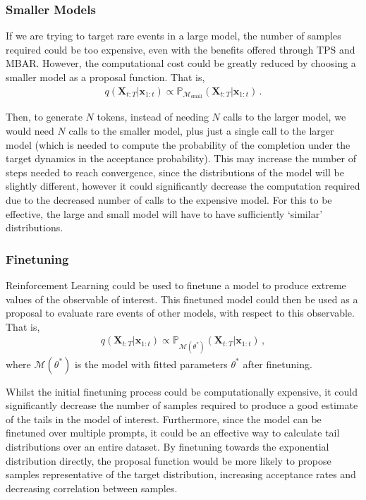 \documentclass{article}
\newcommand{\realtraj}{\mathbf{x}}
\newcommand{\unrealtraj}{\mathbf{X}}
\begin{document}
\subsubsection{Smaller Models}
If we are trying to target rare events in a large model, the number of samples required could be too expensive, even with the benefits offered through TPS and MBAR.
However, the computational cost could be greatly reduced by choosing a smaller model as a proposal function. That is,
\begin{align}
    q(\unrealtraj_{t:T} | \realtraj_{1:t}) \propto \mathbb{P}_{\mathcal{M}_{\text{small}}}( \unrealtraj_{t:T} | \realtraj_{1:t}) \,.
\end{align}


Then, to generate $N$ tokens, instead of needing $N$ calls to the larger model, we would need $N$ calls to the smaller model, plus just a single call to the larger model (which is needed to compute the probability of the completion under the target dynamics in the acceptance probability).
This may increase the number of steps needed to reach convergence, since the distributions of the model will be slightly different, however it could significantly decrease the computation required due to the decreased number of calls to the expensive model.
For this to be effective, the large and small model will have to have sufficiently `similar' distributions.


\subsubsection{Finetuning}
Reinforcement Learning could be used to finetune a model to produce extreme values of the observable of interest.
This finetuned model could then be used as a proposal to evaluate rare events of other models, with respect to this observable. That is,
\begin{align}
    q(\unrealtraj_{t:T} | \realtraj_{1:t}) \propto \mathbb{P}_{\mathcal{M}(\theta^{*})}( \unrealtraj_{t:T} | \realtraj_{1:t}) \,,
\end{align}
where $\mathcal{M}(\theta^{*})$ is the model with fitted parameters $\theta^{*}$ after finetuning.

Whilst the initial finetuning process could be computationally expensive, it could significantly decrease the number of samples required to produce a good estimate of the tails in the model of interest.
Furthermore, since the model can be finetuned over multiple prompts, it could be an effective way to calculate tail distributions over an entire dataset.
By finetuning towards the exponential distribution directly, the proposal function would be more likely to propose samples representative of the target distribution, increasing acceptance rates and decreasing correlation between samples.
\end{document}

